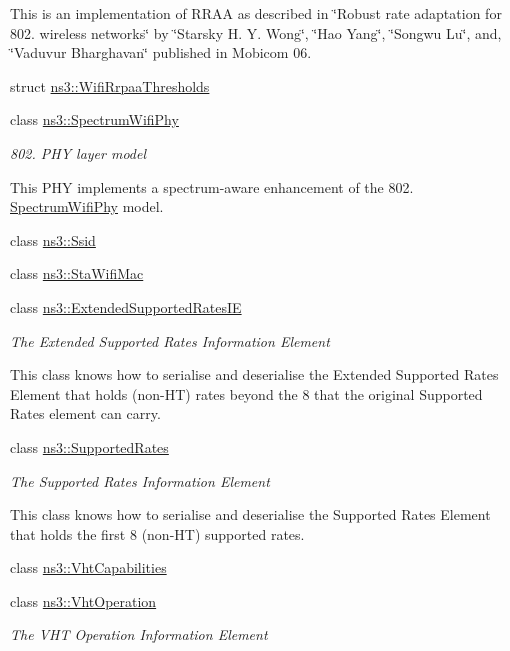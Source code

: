 \begin{DoxyCompactItemize}
\begin{DoxyCompactList}
This is an implementation of R\+R\+AA as described in \char`\"{}\+Robust rate adaptation for 802. wireless networks\char`\"{} by \char`\"{}\+Starsky H. Y. Wong\char`\"{}, \char`\"{}\+Hao Yang\char`\"{}, \char`\"{}\+Songwu Lu\char`\"{}, and, \char`\"{}\+Vaduvur Bharghavan\char`\"{} published in Mobicom 06. \end{DoxyCompactList}\item 
struct \hyperlink{structns3_1_1WifiRrpaaThresholds}{ns3\+::\+Wifi\+Rrpaa\+Thresholds}
\item 
class \hyperlink{classns3_1_1SpectrumWifiPhy}{ns3\+::\+Spectrum\+Wifi\+Phy}
\begin{DoxyCompactList}\small\item\em 802. P\+HY layer model

This P\+HY implements a spectrum-\/aware enhancement of the 802. \hyperlink{classns3_1_1SpectrumWifiPhy}{Spectrum\+Wifi\+Phy} model. \end{DoxyCompactList}\item 
class \hyperlink{classns3_1_1Ssid}{ns3\+::\+Ssid}
\item 
class \hyperlink{classns3_1_1StaWifiMac}{ns3\+::\+Sta\+Wifi\+Mac}
\item 
class \hyperlink{classns3_1_1ExtendedSupportedRatesIE}{ns3\+::\+Extended\+Supported\+Rates\+IE}
\begin{DoxyCompactList}\small\item\em The Extended Supported Rates Information Element

This class knows how to serialise and deserialise the Extended Supported Rates Element that holds (non-\/\+HT) rates beyond the 8 that the original Supported Rates element can carry. \end{DoxyCompactList}\item 
class \hyperlink{classns3_1_1SupportedRates}{ns3\+::\+Supported\+Rates}
\begin{DoxyCompactList}\small\item\em The Supported Rates Information Element

This class knows how to serialise and deserialise the Supported Rates Element that holds the first 8 (non-\/\+HT) supported rates. \end{DoxyCompactList}\item 
class \hyperlink{classns3_1_1VhtCapabilities}{ns3\+::\+Vht\+Capabilities}
\item 
class \hyperlink{classns3_1_1VhtOperation}{ns3\+::\+Vht\+Operation}
\begin{DoxyCompactList}\small\item\em The V\+HT Operation Information Element


\end{DoxyCompactList}
\end{DoxyCompactItemize}
